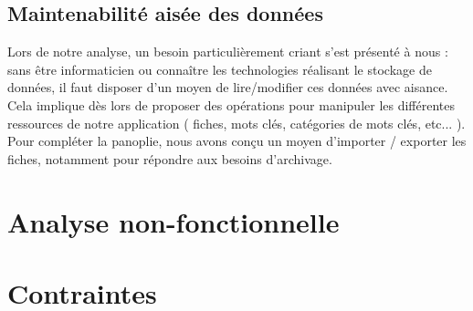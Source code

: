 \subsection*{Maintenabilité aisée des données}

Lors de notre analyse, un besoin particulièrement criant s'est présenté à nous : sans être informaticien ou connaître les technologies réalisant le stockage de données, il faut disposer d'un moyen de lire/modifier ces données avec aisance. \\

Cela implique dès lors de proposer des opérations pour manipuler les différentes ressources de notre application ( fiches, mots clés, catégories de mots clés, etc... ). Pour compléter la panoplie, nous avons conçu un moyen d'importer / exporter les fiches, notamment pour répondre aux besoins d'archivage.

\pagebreak


\section{Analyse non-fonctionnelle}

\section {Contraintes}
